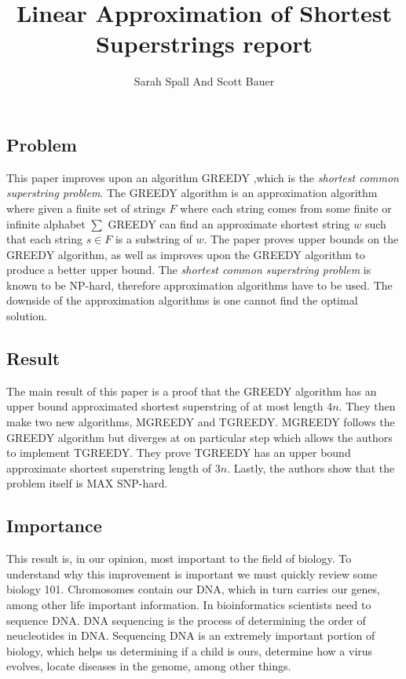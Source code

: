 \documentclass[letterpaper,11pt,titlepage]{article}
\title{Linear Approximation of Shortest Superstrings report}
\author[1]{Sarah Spall And Scott Bauer}
\begin{document}
\maketitle
\newpage


\subsection*{Problem}

This paper improves upon an algorithm GREEDY \cite{tarhio1988greedy},which is the \textit{shortest common superstring problem}. The GREEDY algorithm is an approximation algorithm where given a finite set of strings $F$ where each string comes from some finite or infinite alphabet $\sum$ GREEDY can find an approximate shortest string $w$ such that each string $s \in F$ is a substring of $w$. The paper proves upper bounds on the GREEDY algorithm, as well as improves upon the GREEDY algorithm to produce a better upper bound. The  \textit{shortest common superstring problem} is known to be NP-hard, therefore approximation algorithms have to be used. The downside of the approximation algorithms is one cannot find the optimal solution.  \cite{gallant1980finding}
 


\subsection*{Result}

The main result of this paper is a proof that the GREEDY algorithm has an upper bound approximated shortest superstring of at most length $4n$. They then make two new algorithms, MGREEDY and TGREEDY. MGREEDY follows the GREEDY algorithm but diverges at on particular step which allows the authors to implement TGREEDY. They prove TGREEDY has an upper bound approximate shortest superstring length of $3n$. Lastly, the authors show that the problem itself is MAX SNP-hard.

\subsection*{Importance}

This result is, in our opinion, most important to the field of biology. To understand why this improvement is important we must quickly review some biology 101. Chromosomes contain our DNA, which in turn carries our genes, among other life important information. In bioinformatics scientists need to sequence DNA. DNA sequencing is the process of determining the order of neucleotides in DNA. Sequencing DNA is an extremely important portion of biology, which helps us determining if a child is ours, determine how a virus evolves, locate diseases in the genome, among other things.
\end{document}
